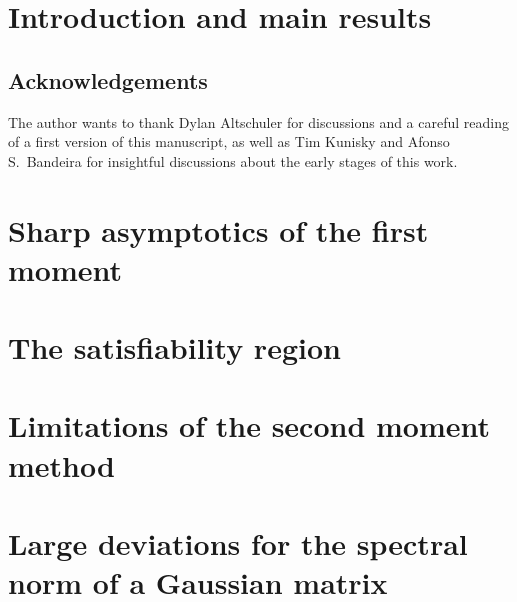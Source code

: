 \documentclass[a4paper,11pt]{article}
\newcommand{\change}[1]{{\color{NavyBlue} #1}}
\begin{document}
\setcounter{tocdepth}{2}
\tableofcontents

\section{Introduction and main results}\label{sec:intro}


\subsection*{Acknowledgements}
The author wants to thank Dylan Altschuler for discussions and a careful reading of a first version of this manuscript, 
as well as Tim Kunisky and Afonso S.\ Bandeira for insightful discussions about the early stages of this work.

\section{Sharp asymptotics of the first moment}\label{sec:1st_moment}


\section{The satisfiability region}\label{sec:2nd_moment}


\section{Limitations of the second moment method}\label{sec:fail_2nd_moment}


\appendix 
\change{
\section{Large deviations for the spectral norm of a Gaussian matrix}\label{sec:appendix_ldp}

}

\printbibliography
\end{document}
